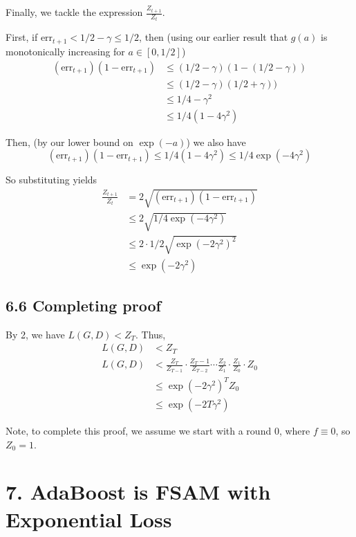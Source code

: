 \documentclass[paper=a4, fontsize=11pt]{scrartcl} %
\numberwithin{equation}{section} %
\numberwithin{figure}{section} %
\numberwithin{table}{section} %
\begin{document}
Finally, we tackle the expression $\frac{Z_{t+1}}{Z_t}$. 

First, if $\textrm{err}_{t+1} < 1/2 - \gamma \leq 1/2$, then (using our earlier result that $g(a)$ is monotonically increasing for $a \in [0,1/2]$)
\begin{align*}
(\textrm{err}_{t+1}) (1 - \textrm{err}_{t+1}) &\leq (1/2 - \gamma)(1 - (1/2 - \gamma)) \\
&\leq (1/2 - \gamma)(1/2 + \gamma)) \\
&\leq 1/4  - \gamma^2 \\
&\leq 1/4 ( 1 - 4 \gamma^2)
\end{align*}

Then, (by our lower bound on $\exp(-a)$) we also have
\[(\textrm{err}_{t+1}) (1 - \textrm{err}_{t+1}) \leq 1/4 ( 1 - 4 \gamma^2) \leq 1/4 \exp(-4 \gamma^2) \]

So substituting yields
\begin{align*}
\frac{Z_{t+1}}{Z_t} &= 2 \sqrt{(\textrm{err}_{t+1}) (1 - \textrm{err}_{t+1})} \\
&\leq 2 \sqrt{1/4 \exp(-4 \gamma^2)} \\
&\leq 2 \cdot1/2 \sqrt{\exp(-2 \gamma^2)^2} \\
&\leq \exp(-2 \gamma^2)
\end{align*}

\subsection*{6.6 Completing proof}

By 2, we have $L(G, D) < Z_T$. Thus,
\begin{align*}
L(G, D) &< Z_T \\
L(G, D) &< \frac{Z_T}{Z_{T-1}} \cdot  \frac{Z_T-1}{Z_{T-2}} \cdots  \frac{Z_2}{Z_{1}} \cdot \frac{Z_1}{Z_{0}} \cdot Z_0 \\
&\leq \exp(-2 \gamma^2)^{T} Z_0  \\
&\leq \exp(-2 T \gamma^2)^{}
\end{align*}

Note, to complete this proof, we assume we start with a round 0, where $f \equiv 0$, so $Z_0 = 1$.


\section*{7. AdaBoost is FSAM with Exponential Loss}
\end{document}

